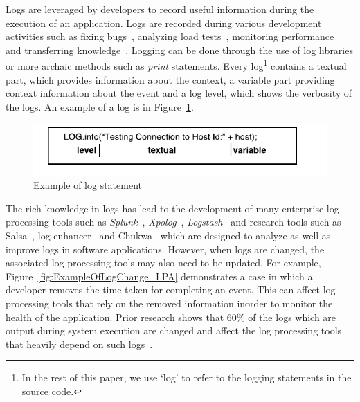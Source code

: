 

Logs are leveraged by developers to record useful information during the execution of an application. Logs are recorded during various development activities such as  fixing bugs~\cite{ConsoleLogs,JGLouMining,QFuanomaly}, analyzing load tests~\cite{Automatic}, monitoring performance~\cite{Yuan} and transferring knowledge~\cite{IanWCRE}.
Logging can be done through the use of log libraries or more archaic methods such as \textsl{print} statements. Every log\footnote{
In the rest of this paper, we use ‘log’ to refer to the logging statements in the source code.} contains a textual part, which provides information about the context, a variable part providing context information about the event and a log level, which shows the verbosity of the logs. An example of a log is in Figure~\ref{fig:logexample}.

\begin{figure}[thb]
	\centering
	\includegraphics[width=1\columnwidth]{logexample}
	\caption{Example of log statement}
	\label{fig:logexample}
\end{figure}




The rich knowledge in logs has lead to the development of many enterprise log processing tools such as \textsl{Splunk}~\cite{carasso2012exploring}, \textsl{Xpolog}~\cite{xpolog}, \textsl{Logstash}~\cite{xu2013detecting} and research tools such as Salsa~\cite{TanSalsa}, log-enhancer~\cite{Yuan} and Chukwa~\cite{chukwa} which are designed to analyze as well as improve logs in software applications. However, when logs are changed, the associated log processing tools may also need to be updated. For example, Figure~\ref{fig:ExampleOfLogChange_LPA} demonstrates a case in which a developer removes the time taken for completing an event. This can affect log processing tools that rely on the removed information inorder to monitor the health of the application. Prior research shows that 60\% of the logs which are output during system execution are changed and affect the log processing tools that heavily depend on such logs~\cite{IanWCRE}.

